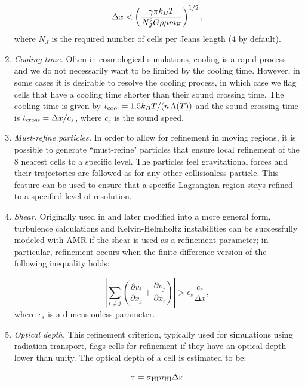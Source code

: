 \begin{enumerate}
\begin{equation}
\Delta x < \left( \frac{\gamma \pi k_B T}{N_J^2 G \rho \mu \mh} \right)^{1/2},
\end{equation}
where $N_J$ is the required number of cells per Jeans length (4 by default).

\item{\em Cooling time.}  Often in cosmological simulations, cooling
  is a rapid process and we do not necessarily want to be limited by
  the cooling time.  However, in some cases it is desirable to resolve
  the cooling process, in which case we flag cells that have a cooling
  time shorter than their sound crossing time.  The cooling time is
  given by $t_{\rm cool} = 1.5 k_BT / (n\, \Lambda(T))$ and the sound
  crossing time is $t_{\rm cross} = \Delta x / c_s$, where $c_s$ is
  the sound speed.


\item{\em Must-refine particles.}  In order to allow for refinement in
  moving regions, it is possible to generate ``must-refine" particles
  that ensure local refinement of the 8 nearest cells to a specific
  level.  The particles feel gravitational forces and their
  trajectories are followed as for any other collisionless particle.
  This feature can be used to ensure that a specific Lagrangian region
  stays refined to a specified level of resolution. 


\item{\em Shear.} Originally used in \citet{Kritsuk06} and later 
  modified into a more general form, turbulence calculations and
  Kelvin-Helmholtz instabilities can be successfully modeled with AMR if 
  the shear is used as a refinement parameter; in particular, refinement 
  occurs when the finite difference version of the following inequality
  holds:

\begin{equation}
\left| \sum_{i \ne j} \left( \frac{\partial v_i}{\partial x_j} + \frac{\partial v_j}{\partial x_i} \right) \right|
> \epsilon_s \frac{c_s}{\Delta x},
\end{equation}
where $\epsilon_s$ is a dimensionless parameter.

\item{\em Optical depth.} This refinement criterion, typically used
for simulations using radiation transport, flags cells for refinement
if they have an  optical depth lower than unity.  The
optical depth of a cell is estimated to be:

\begin{equation}
\tau = \sigma_{\rm HI} n_{\rm HI} \Delta x 
\end{equation}


\end{enumerate}
